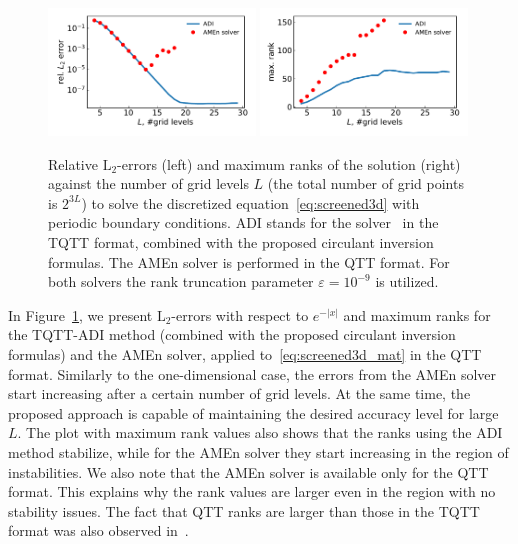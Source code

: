 \documentclass[a4paper]{article}
\newcommand{\LL}{L}
\begin{document}
{\begin{figure}
    \centering
    \includegraphics[width=0.49\textwidth]{NLAA_rev1/err_3d.pdf}
    \hfill
    \includegraphics[width=0.49\textwidth]{NLAA_rev1/ranks_3d.pdf}
    \caption{{\color{blue} Relative $\mathrm{L}_2$-errors (left) and maximum ranks of the solution (right) against the number of grid levels $\LL$ (the total number of grid points is $2^{3\LL}$) to solve the discretized equation~\eqref{eq:screened3d} with periodic boundary conditions. ADI stands for the solver~\cite{rakhuba2021robust} in the TQTT format, combined with the proposed circulant inversion formulas. The AMEn solver is performed in the QTT format. For both solvers the rank truncation parameter $\varepsilon = 10^{-9}$ is utilized.}}
    \label{fig:3d_errs}
\end{figure}
In Figure~\ref{fig:3d_errs}, we present $\mathrm{L}_2$-errors with respect to $e^{-|x|}$ and maximum ranks for the TQTT-ADI method (combined with the proposed circulant inversion formulas) and the AMEn solver, applied to~\eqref{eq:screened3d_mat} in the QTT format.
Similarly to the one-dimensional case, the errors from the AMEn solver start increasing after a certain number of grid levels.
At the same time, the proposed approach is capable of maintaining the desired accuracy level for large $L$.
The plot with maximum rank values also shows that the ranks using the ADI method stabilize, while for the AMEn solver they start increasing in the region of instabilities.
We also note that the AMEn solver is available only for the QTT format. 
This explains why the rank values are larger even in the region with no stability issues.
The fact that QTT ranks are larger than those in the TQTT format was also observed in~\cite{marcati2019tensor,rakhuba2021robust}.

}
\end{document}
